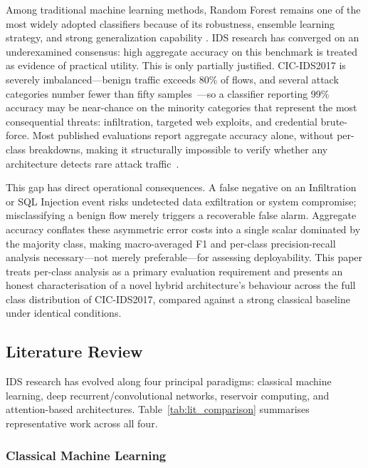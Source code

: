 \documentclass[5p,times]{elsarticle}
\begin{document}
	Among traditional machine learning methods, Random Forest remains one of the most widely adopted classifiers because of its robustness, ensemble learning strategy, and strong generalization capability \cite{breiman2001}.
	IDS research has converged on an underexamined consensus: high aggregate
	accuracy on this benchmark is treated as evidence of practical utility.
	This is only partially justified. CIC-IDS2017 is severely
	imbalanced---benign traffic exceeds 80\% of flows, and several attack
	categories number fewer than fifty samples~\cite{cicids2017,ring2019survey}---so
	a classifier reporting 99\% accuracy may be near-chance on the minority
	categories that represent the most consequential threats: infiltration,
	targeted web exploits, and credential brute-force. Most published
	evaluations report aggregate accuracy alone, without per-class
	breakdowns, making it structurally impossible to verify whether any
	architecture detects rare attack
	traffic~\cite{thakkar2020,buczak2016survey}.
	
	This gap has direct operational consequences. A false negative on an
	Infiltration or SQL Injection event risks undetected data exfiltration or
	system compromise; misclassifying a benign flow merely triggers a
	recoverable false alarm. Aggregate accuracy conflates these asymmetric
	error costs into a single scalar dominated by the majority class, making
	macro-averaged F1 and per-class precision-recall analysis
	necessary---not merely preferable---for assessing deployability. This
	paper treats per-class analysis as a primary evaluation requirement and
	presents an honest characterisation of a novel hybrid architecture's
	behaviour across the full class distribution of CIC-IDS2017, compared
	against a strong classical baseline under identical conditions.
	
	\subsection{Literature Review}
	\label{sec:litreview}
	
	IDS research has evolved along four principal paradigms: classical
	machine learning, deep recurrent/convolutional networks, reservoir
	computing, and attention-based architectures. Table~\ref{tab:lit_comparison}
	summarises representative work across all four.
	
	\subsubsection{Classical Machine Learning}
	\label{subsec:classical}
	
\end{document}
